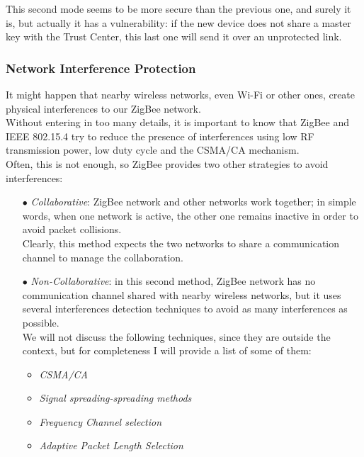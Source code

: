 \documentclass[12pt]{report}
\begin{document}
{\begin{itemize}
This second mode seems to be more secure than the previous one, and surely it is, but actually it has a vulnerability: if the new device does not share a master key with the Trust Center, this last one will send it over an unprotected link. 

\end{itemize}

\subsubsection{Network Interference Protection}
\bigskip
It might happen that nearby wireless networks, even Wi-Fi or other ones, create physical interferences to our ZigBee network.\\
Without entering in too many details, it is important to know that ZigBee and IEEE 802.15.4 try to reduce the presence of interferences using low RF transmission power, low duty cycle and the CSMA/CA mechanism.\\
Often, this is not enough, so ZigBee provides two other strategies to avoid interferences:

\begin{itemize}
\setlength{\itemindent}{+4mm}
\item[$\bullet$] \emph{Collaborative}: ZigBee network and other networks work together; in simple words, when one network is active, the other one remains inactive in order to avoid packet collisions.\\
Clearly, this method expects the two networks to share a communication channel to manage the collaboration.

\item[$\bullet$] \emph{Non-Collaborative}: in this second method, ZigBee network has no communication channel shared with nearby wireless networks, but it uses several interferences detection techniques to avoid as many interferences as possible.\\
We will not discuss the following techniques, since they are outside the context, but for completeness I will provide a list of some of them:

\begin{itemize}
\setlength{\itemindent}{+4mm}
\item \emph{CSMA/CA}
\item \emph{Signal spreading-spreading methods}
\item \emph{Frequency Channel selection}
\item \emph{Adaptive Packet Length Selection}\\
\end{itemize}


\end{itemize}}
\end{document}
